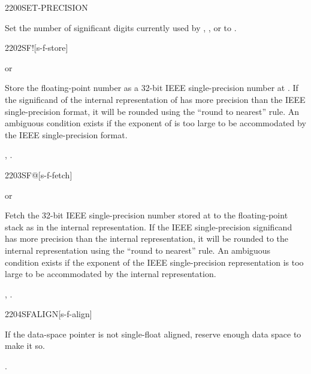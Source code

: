 \begin{worddef}{2200}{SET-PRECISION}
\item {}

	Set the number of significant digits currently used by ,
	, or  to .
\end{worddef}


\begin{worddef}{2202}{SF!}[s-f-store]
\item {}  or

	Store the floating-point number  as a 32-bit IEEE
	single-precision number at . If the significand
	of the internal representation of  has more precision
	than the IEEE single-precision format, it will be rounded using
	the ``round to nearest'' rule. An ambiguous condition exists if
	the exponent of  is too large to be accommodated by the
	IEEE single-precision format.

\see {},
	.
\end{worddef}


\begin{worddef}{2203}{SF@}[s-f-fetch]
\item {}  or

	Fetch the 32-bit IEEE single-precision number stored at
	 to the floating-point stack as  in the
	internal representation. If the IEEE single-precision
	significand has more precision than the internal representation,
	it will be rounded to the internal representation using the
	``round to nearest'' rule. An ambiguous condition exists if the
	exponent of the IEEE single-precision representation is too
	large to be accommodated by the internal representation.

\see {},
	.
\end{worddef}


\begin{worddef}{2204}{SFALIGN}[s-f-align]
\item \stack{}{}

	If the data-space pointer is not single-float aligned, reserve
	enough data space to make it so.

\see {}.
\end{worddef}


